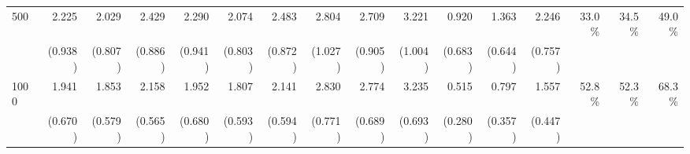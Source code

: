 \begin{table}[H]
{\begin{tabular}{lrrrrrrrrrrrrrrr}
500  & 2.225  & 2.029  & 2.429  & 2.290  & 2.074  & 2.483  & 2.804  & 2.709  & 3.221  & 0.920  & 1.363  & 2.246  & 33.0\%  & 34.5\%  & 49.0\% \\
       & (0.938)  & (0.807)  & (0.886)  & (0.941)  & (0.803)  & (0.872)  & (1.027)  & (0.905)  & (1.004)  & (0.683)  & (0.644)  & (0.757)  &   &   &  \\
1000  & 1.941  & 1.853  & 2.158  & 1.952  & 1.807  & 2.141  & 2.830  & 2.774  & 3.235  & 0.515  & 0.797  & 1.557  & 52.8\%  & 52.3\%  & 68.3\% \\
       & (0.670)  & (0.579)  & (0.565)  & (0.680)  & (0.593)  & (0.594)  & (0.771)  & (0.689)  & (0.693)  & (0.280)  & (0.357)  & (0.447)  &   &   &  \\
\bottomrule
\end{tabular}%
}
\label{tab_mse}
\end{table}